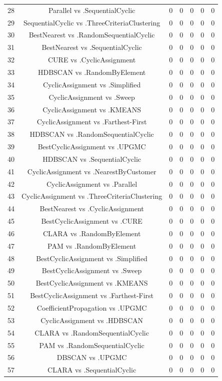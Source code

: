 \documentclass[a4paper,10pt]{article}
\begin{document}
\begin{landscape}
\begin{table}[!htp]
\begin{tabular}{ccccccc}
28&Parallel vs .SequentialCyclic&0&0&0&0&0\\
29&SequentialCyclic vs .ThreeCriteriaClustering&0&0&0&0&0\\
30&BestNearest vs .RandomSequentialCyclic&0&0&0&0&0\\
31&BestNearest vs .SequentialCyclic&0&0&0&0&0\\
32&CURE vs .CyclicAssignment&0&0&0&0&0\\
33&HDBSCAN vs .RandomByElement&0&0&0&0&0\\
34&CyclicAssignment vs .Simplified&0&0&0&0&0\\
35&CyclicAssignment vs .Sweep&0&0&0&0&0\\
36&CyclicAssignment vs .KMEANS&0&0&0&0&0\\
37&CyclicAssignment vs .Farthest-First&0&0&0&0&0\\
38&HDBSCAN vs .RandomSequentialCyclic&0&0&0&0&0\\
39&BestCyclicAssignment vs .UPGMC&0&0&0&0&0\\
40&HDBSCAN vs .SequentialCyclic&0&0&0&0&0\\
41&CyclicAssignment vs .NearestByCustomer&0&0&0&0&0\\
42&CyclicAssignment vs .Parallel&0&0&0&0&0\\
43&CyclicAssignment vs .ThreeCriteriaClustering&0&0&0&0&0\\
44&BestNearest vs .CyclicAssignment&0&0&0&0&0\\
45&BestCyclicAssignment vs .CURE&0&0&0&0&0\\
46&CLARA vs .RandomByElement&0&0&0&0&0\\
47&PAM vs .RandomByElement&0&0&0&0&0\\
48&BestCyclicAssignment vs .Simplified&0&0&0&0&0\\
49&BestCyclicAssignment vs .Sweep&0&0&0&0&0\\
50&BestCyclicAssignment vs .KMEANS&0&0&0&0&0\\
51&BestCyclicAssignment vs .Farthest-First&0&0&0&0&0\\
52&CoefficientPropagation vs .UPGMC&0&0&0&0&0\\
53&CyclicAssignment vs .HDBSCAN&0&0&0&0&0\\
54&CLARA vs .RandomSequentialCyclic&0&0&0&0&0\\
55&PAM vs .RandomSequentialCyclic&0&0&0&0&0\\
56&DBSCAN vs .UPGMC&0&0&0&0&0\\
57&CLARA vs .SequentialCyclic&0&0&0&0&0\\

\end{tabular}
\end{table}
\end{landscape}
\end{document}
